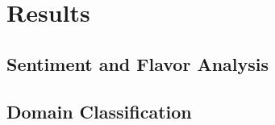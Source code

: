 \documentclass[final]{ieee}
\begin{document}










\section{Results}

\subsection{Sentiment and Flavor Analysis}

\subsection{Domain Classification}
            
\end{document}
